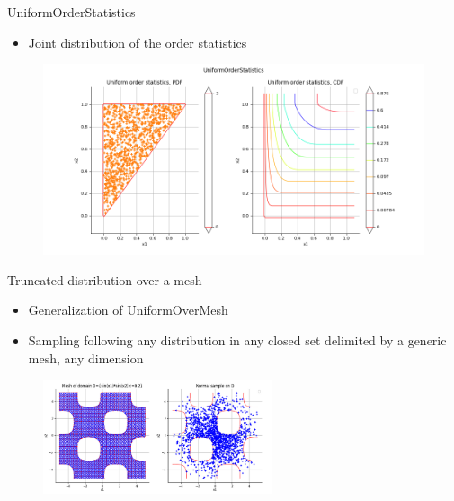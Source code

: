 \documentclass[aspectratio=169]{beamer}
\begin{document}
\begin{frame}{UniformOrderStatistics}

\begin{itemize}
\item Joint distribution of the order statistics
\end{itemize}

\begin{figure}[!htb]
  \includegraphics[width=1.3\textwidth]{figures/UniformOrderStatistics}
\endminipage\hfill
\end{figure}
\end{frame}



\begin{frame}{Truncated distribution over a mesh}
\begin{itemize}
\item Generalization of UniformOverMesh
\item Sampling following any distribution in any closed set delimited by a generic mesh, any dimension
\end{itemize}
\begin{figure}
   \includegraphics[width=0.6\textwidth]{figures/TruncatedOverMesh}
\end{figure}
\end{frame}
\end{document}
